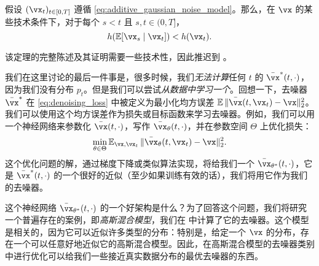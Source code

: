 \documentclass[../../book-main_zh.tex]{subfiles}
\begin{document}
\begin{theorem}
	假设 \((\vx_{t})_{t \in [0, T]}\) 遵循 \eqref{eq:additive_gaussian_noise_model}。那么，在 \(\vx\) 的某些技术条件下，对于每个 \(s < t\) 且 \(s, t \in (0, T]\)，
	\begin{equation}
		h(\Ex[\vx_{s} \mid \vx_{t}]) < h(\vx_{t}).
	\end{equation}
\end{theorem}
该定理的完整陈述及其证明需要一些技术性，因此推迟到 。

我们在这里讨论的最后一件事是，很多时候，我们\textit{无法计算}任何 \(t\) 的 \(\bar{\vx}^{\ast}(t, \cdot)\)，因为我们没有分布 \(p_{t}\)。但是我们可以尝试\textit{从数据中学习一个}。回想一下，去噪器 \(\bar{\vx}^{\ast}\) 在 \eqref{eq:denoising_loss} 中被定义为最小化均方误差 \(\Ex\norm{\bar{\vx}(t, \vx_{t}) - \vx}_{2}^{2}\)。我们可以使用这个均方误差作为损失或目标函数来学习去噪器。例如，我们可以用一个神经网络来参数化 \(\bar{\vx}(t, \cdot)\)，写作 \(\bar{\vx}_{\theta}(t, \cdot)\)，并在参数空间 \(\Theta\) 上优化损失：
\begin{equation}
	\min_{\theta \in \Theta}\Ex_{\vx, \vx_{t}}\norm{\bar{\vx}_{\theta}(t, \vx_{t}) - \vx}_{2}^{2}.
\end{equation}
这个优化问题的解，通过梯度下降或类似算法实现，将给我们一个 \(\bar{\vx}_{\theta^{\ast}}(t, \cdot)\)，它是 \(\bar{\vx}^{\ast}(t, \cdot)\) 的一个很好的近似（至少如果训练有效的话），我们将用它作为我们的去噪器。

这个神经网络 \(\bar{\vx}_{\theta^{\ast}}(t, \cdot)\) 的一个好架构是什么？为了回答这个问题，我们将研究一个普遍存在的案例，即\textit{高斯混合模型}，我们在  中计算了它的去噪器。这个模型是相关的，因为它可以近似许多类型的分布：特别是，给定一个 \(\vx\) 的分布，存在一个可以任意好地近似它的高斯混合模型。因此，在高斯混合模型的去噪器类别中进行优化可以给我们一些接近真实数据分布的最优去噪器的东西。
\end{document}

